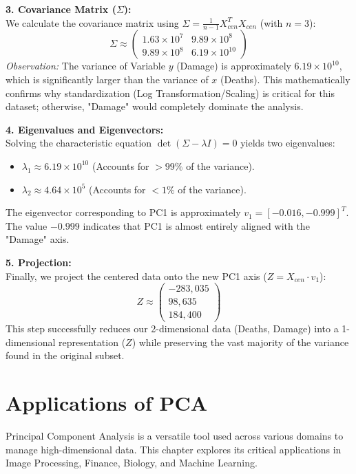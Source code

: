 \documentclass[12pt, a4paper]{report}
\begin{document}
\textbf{3. Covariance Matrix ($\Sigma$):} \\
We calculate the covariance matrix using $\Sigma = \frac{1}{n-1} X_{cen}^T X_{cen}$ (with $n=3$):
\[
\Sigma \approx \begin{pmatrix} 
1.63 \times 10^7 & 9.89 \times 10^8 \\ 
9.89 \times 10^8 & 6.19 \times 10^{10} 
\end{pmatrix}
\]
\textit{Observation:} The variance of Variable $y$ (Damage) is approximately $6.19 \times 10^{10}$, which is significantly larger than the variance of $x$ (Deaths). This mathematically confirms why standardization (Log Transformation/Scaling) is critical for this dataset; otherwise, "Damage" would completely dominate the analysis.

\textbf{4. Eigenvalues and Eigenvectors:} \\
Solving the characteristic equation $\det(\Sigma - \lambda I) = 0$ yields two eigenvalues:
\begin{itemize}
    \item $\lambda_1 \approx 6.19 \times 10^{10}$ (Accounts for $>99\%$ of the variance).
    \item $\lambda_2 \approx 4.64 \times 10^5$ (Accounts for $<1\%$ of the variance).
\end{itemize}
The eigenvector corresponding to PC1 is approximately $v_1 = [-0.016, -0.999]^T$. The value $-0.999$ indicates that PC1 is almost entirely aligned with the "Damage" axis.

\textbf{5. Projection:} \\
Finally, we project the centered data onto the new PC1 axis ($Z = X_{cen} \cdot v_1$):
\[
Z \approx \begin{pmatrix} -283,035 \\ 98,635 \\ 184,400 \end{pmatrix}
\]
This step successfully reduces our 2-dimensional data (Deaths, Damage) into a 1-dimensional representation ($Z$) while preserving the vast majority of the variance found in the original subset.

\newpage
\chapter{Applications of PCA}

Principal Component Analysis is a versatile tool used across various domains to manage high-dimensional data. This chapter explores its critical applications in Image Processing, Finance, Biology, and Machine Learning.
\end{document}
